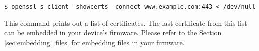 \documentclass[main.tex]{subfiles}
\begin{document}
\begin{verbatim}
$ openssl s_client -showcerts -connect www.example.com:443 < /dev/null
\end{verbatim}

This command prints out a list of certificates. The last certificate from this list can be embedded in your device's firmware. Please refer to the Section \ref{sec:embedding_files} for embedding files in your firmware.
\end{document}
